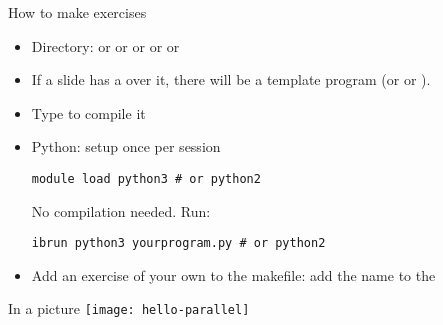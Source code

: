 \begin{numberedframe}{How to make exercises}
  \begin{itemize}
  \item Directory:  or  or  or 
    or  or 
  \item If a slide has a  over it, there will be a
    template program  (or  or ).
  \item Type  to compile it
  \item Python: setup once per session
\begin{verbatim}
module load python3 # or python2
\end{verbatim}
No compilation needed. Run:
\begin{verbatim}
ibrun python3 yourprogram.py # or python2
\end{verbatim}
\item Add an exercise of your own to the makefile: add the name to
    the 
  \end{itemize}
\end{numberedframe}

\begin{exerciseframe}[hello]
  
\end{exerciseframe}

\begin{numberedframe}{In a picture}
  \texttt{[image: hello-parallel]}
\end{numberedframe}


